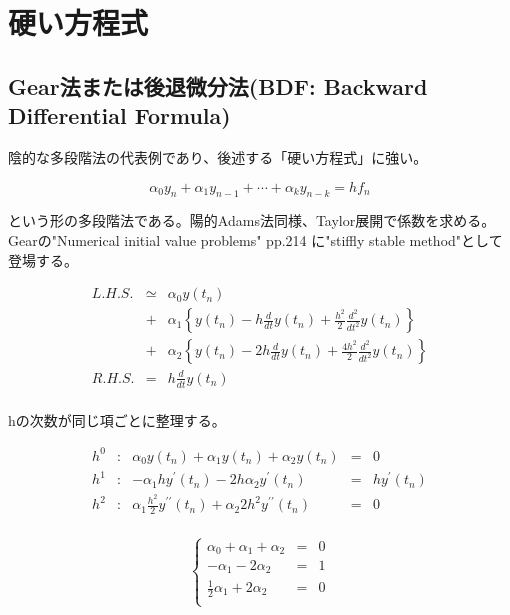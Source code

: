 \section{硬い方程式}
\subsection{Gear法または後退微分法(BDF: Backward Differential Formula)}
陰的な多段階法の代表例であり、後述する「硬い方程式」に強い。

\[\alpha_{0} y_{n} + \alpha_{1} y_{n-1} + \cdots + \alpha_{k} y_{n-k} = h f_{n}\]

という形の多段階法である。陽的Adams法同様、Taylor展開で係数を求める。Gearの"Numerical initial value problems" pp.214 に"stiffly stable method"として登場する。

\begin{eqnarray*}
L.H.S. & \simeq & \alpha_0 y(t_n) \\ 
       & +      & \alpha_1 \left\{y(t_{n}) - h \frac{d}{dt} y(t_n) + \frac{h^2}{2} \frac{d^2}{dt^2} y(t_{n}) \right\} \\
       & +      & \alpha_2 \left\{y(t_{n}) - 2h \frac{d}{dt} y(t_n) + \frac{4h^2}{2} \frac{d^2}{dt^2} y(t_{n}) \right\} \\
R.H.S. & = & h \frac{d}{dt}y(t_{n}) \\
\end{eqnarray*}

hの次数が同じ項ごとに整理する。

\[
\begin{array}{lccll}
h^0 & : & \alpha_0 y(t_n) + \alpha_1 y(t_n) + \alpha_2 y(t_n) & = & 0\\
h^1 & : & - \alpha_1 h y^{\prime}(t_n) - 2h \alpha_2 y^{\prime}(t_n) & = & h y^{\prime}(t_n)\\
h^2 & : & \alpha_1 \frac{h^2}{2} y^{\prime\prime}(t_n) + \alpha_2 2h^2 y^{\prime\prime}(t_n) & = & 0\\
\end{array}
\]

\[
\left\{
\begin{array}{lcl}
\alpha_0 + \alpha_1 + \alpha_2 & = & 0 \\
- \alpha_1 - 2 \alpha_2  & = & 1\\ 
\frac{1}{2} \alpha_1  + 2 \alpha_2  & = & 0\\
\end{array}
\right.
\]

